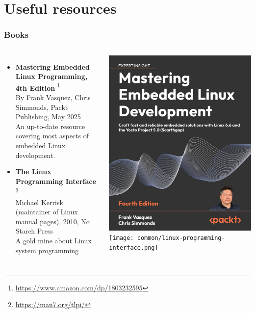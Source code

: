 \section{Useful resources}

\begin{frame}
  \frametitle{Books}
  \begin{columns}
    \small
    \begin{itemize}
    \item {\bf Mastering Embedded Linux Programming, 4th Edition}
      \footnote{\tiny
\url{https://www.amazon.com/dp/1803232595}}\\
      By Frank Vasquez, Chris Simmonds, Packt Publishing, May 2025\\
      An up-to-date resource covering most aspects of embedded Linux
      development.
    \item {\bf The Linux Programming Interface}
      \footnote{\tiny \url{https://man7.org/tlpi/}}\\
      Michael Kerrisk (maintainer of Linux manual pages), 2010, No Starch Press\\
      A gold mine about Linux system programming\\
    \end{itemize}
    \normalsize
    \includegraphics[height=0.25\textheight]{slides/sysdev-references/book-mastering-embedded-linux4.jpg}\\
    \vspace{0.5cm}
    \texttt{[image: common/linux-programming-interface.png]}\\
  \end{columns}
\end{frame}

